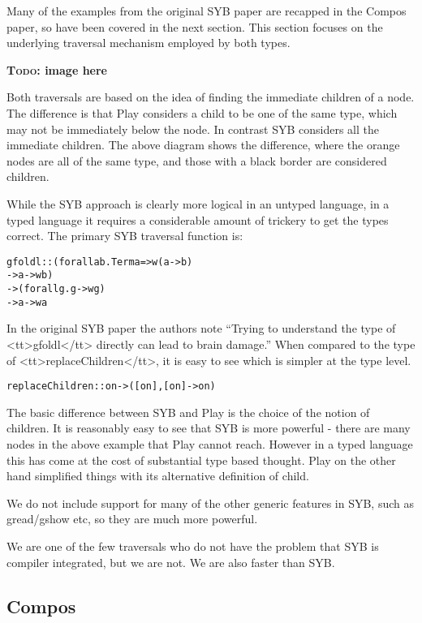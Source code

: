 \documentclass[preprint]{sigplanconf}
\newcommand{\todo}[1]{\textbf{\textsc{Todo:} #1}}
\newenvironment{code}{\begin{alltt}\small}{\end{alltt}}
\begin{document}
Many of the examples from the original SYB paper are recapped in the Compos paper, so have been covered in the next section. This section focuses on the underlying traversal mechanism employed by both types.

\todo{image here}

Both traversals are based on the idea of finding the immediate children of a node. The difference is that Play considers a child to be one of the same type, which may not be immediately below the node. In contrast SYB considers all the immediate children. The above diagram shows the difference, where the orange nodes are all of the same type, and those with a black border are considered children.

While the SYB approach is clearly more logical in an untyped language, in a typed language it requires a considerable amount of trickery to get the types correct. The primary SYB traversal function is:

\begin{code}
gfoldl :: (forall a b. Term a => w (a -> b)
                              -> a -> w b)
       -> (forall g. g -> w g)
       -> a -> w a
\end{code}

In the original SYB paper the authors note ``Trying to understand the type of <tt>gfoldl</tt> directly can lead to brain damage.'' When compared to the type of <tt>replaceChildren</tt>, it is easy to see which is simpler at the type level.

\begin{code}
replaceChildren :: on -> ([on], [on] -> on)
\end{code}

The basic difference between SYB and Play is the choice of the notion of children. It is reasonably easy to see that SYB is more powerful - there are many nodes in the above example that Play cannot reach. However in a typed language this has come at the cost of substantial type based thought. Play on the other hand simplified things with its alternative definition of child.

We do not include support for many of the other generic features in SYB, such as gread/gshow etc, so they are much more powerful.

We are one of the few traversals who do not have the problem that SYB is compiler integrated, but we are not. We are also faster than SYB.

\subsection{Compos}
\end{document}

